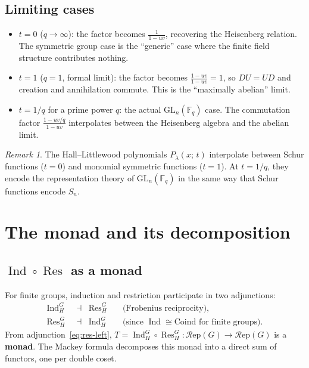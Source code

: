 \documentclass[12pt,a4paper]{article}
\theoremstyle{definition}
\theoremstyle{remark}
\newtheorem{remark}[theorem]{Remark}
\newcommand{\F}{\mathbb{F}}
\newcommand{\Ind}{\operatorname{Ind}}
\newcommand{\Res}{\operatorname{Res}}
\newcommand{\GL}{\mathrm{GL}}
\newcommand{\Rep}{\mathcal{R}\mathrm{ep}}
\begin{document}
\subsection{Limiting cases}

\begin{itemize}
\item $t = 0$ ($q \to \infty$): the factor becomes $\frac{1}{1-uv}$,
  recovering the Heisenberg relation. The symmetric group case is the
  ``generic'' case where the finite field structure contributes
  nothing.

\item $t = 1$ ($q = 1$, formal limit): the factor becomes
  $\frac{1-uv}{1-uv} = 1$, so $DU = UD$ and creation and
  annihilation commute. This is the ``maximally abelian'' limit.

\item $t = 1/q$ for a prime power $q$: the actual $\GL_n(\F_q)$
  case. The commutation factor $\frac{1-uv/q}{1-uv}$ interpolates
  between the Heisenberg algebra and the abelian limit.
\end{itemize}

\begin{remark}
The Hall--Littlewood polynomials $P_\lambda(x;\, t)$ interpolate
between Schur functions ($t = 0$) and monomial symmetric functions
($t = 1$). At $t = 1/q$, they encode the representation theory of
$\GL_n(\F_q)$ in the same way that Schur functions encode $S_n$.
\end{remark}

\section{The monad and its decomposition}
\label{sec:monad}

\subsection{$\Ind \circ \Res$ as a monad}

For finite groups, induction and restriction participate in two
adjunctions:
\begin{align}
  \Ind_H^G &\;\dashv\; \Res_H^G
  && \text{(Frobenius reciprocity)},
  \label{eq:frob} \\
  \Res_H^G &\;\dashv\; \Ind_H^G
  && \text{(since $\Ind \cong \mathrm{Coind}$ for finite groups)}.
  \label{eq:res-left}
\end{align}
From adjunction~\eqref{eq:res-left}, $T = \Ind_H^G \circ \Res_H^G :
\Rep(G) \to \Rep(G)$ is a \textbf{monad}. The Mackey formula
decomposes this monad into a direct sum of functors, one per double
coset.
\end{document}
